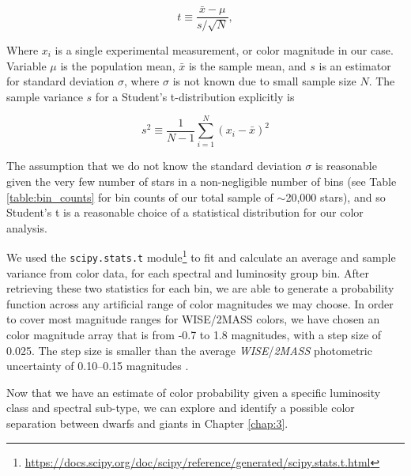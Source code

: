 \begin{equation}
    t \equiv \frac{\bar{x}-\mu}{s/\sqrt{N}} ,
\end{equation}

Where $x_{i}$ is a single experimental measurement, or color magnitude in our case. Variable $\mu$ is the population mean, $\bar{x}$ is the sample mean, and $s$ is an estimator for standard deviation $\sigma$, where $\sigma$ is not known due to small sample size $N$. The sample variance $s$ for a Student's t-distribution explicitly is

\begin{equation}
    s^2 \equiv \frac{1}{N-1}\sum_{i=1}^{N} (x_{i}-\bar{x})^2
\end{equation}

The assumption that we do not know the standard deviation $\sigma$ is reasonable given the very few number of stars in a non-negligible number of bins (see Table \ref{table:bin_counts} for bin counts of our total sample of $\sim$20,000 stars), and so Student's t is a reasonable choice of a statistical distribution for our color analysis.

We used the \texttt{scipy.stats.t} module\footnote{\url{https://docs.scipy.org/doc/scipy/reference/generated/scipy.stats.t.html}} to fit and calculate an average and sample variance from color data, for each spectral and luminosity group bin. After retrieving these two statistics for each bin, we are able to generate a probability function across any artificial range of color magnitudes we may choose. In order to cover most magnitude ranges for WISE/2MASS colors, we have chosen an color magnitude array that is from -0.7 to 1.8 magnitudes, with a step size of 0.025. The step size is smaller than the average \textit{WISE}/\textit{2MASS} photometric uncertainty of 0.10--0.15 magnitudes \citep{2MASS,ALLWISE}. 

Now that we have an estimate of color probability given a specific luminosity class and spectral sub-type, we can explore and identify a possible color separation between dwarfs and giants in Chapter \ref{chap:3}. 


